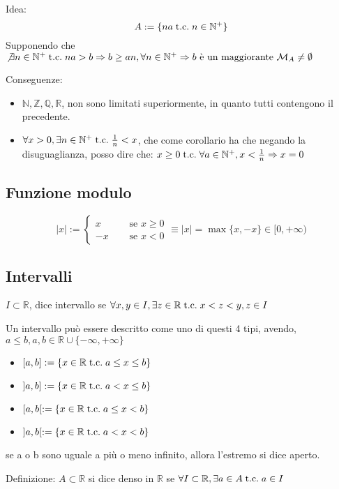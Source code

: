\documentclass[a4paper,12pt]{article}
\begin{document}
	Idea:
	\[A :=  \{na \;\text{t.c.}\; n \in \mathbb{N}^+\}\]
	Supponendo che $\not \exists n \in \mathbb{N}^+ \;\text{t.c.}\; na > b \Rightarrow b \geq an, \forall n \in \mathbb{N}^+ \Rightarrow b \text{ è un maggiorante } \mathcal{M}_A \not = \emptyset $ %
	
	Conseguenze:
	\begin{itemize}
		\item $\mathbb{N}, \mathbb{Z}, \mathbb{Q}, \mathbb{R}$, non sono limitati superiormente, in quanto tutti contengono il precedente.
		\item $\forall x > 0, \exists n \in \mathbb{N}^+ \;\text{t.c.}\; \frac{1}{n} < x$, che come corollario ha che negando la disuguaglianza, posso dire che:
		$x \geq 0 \;\text{t.c.}\; \forall a \in \mathbb{N}^+, x < \frac{1}{n} \Rightarrow x = 0$
	\end{itemize}
	
	\subsection{Funzione modulo}
	\[|x| := 
	\left\{
	\begin{aligned}
		x & \quad \text{ se } x \geq 0\\
		-x & \quad \text{ se } x < 0
	\end{aligned}
	\right. \equiv |x| = \max\{x, -x\} \in [0, +\infty)
	\]
	
	\subsection{Intervalli}
	$I \subset \mathbb{R}$, dice intervallo se $\forall x,y \in I, \exists z \in \mathbb{R} \;\text{t.c.}\; x < z < y, z \in I$
	
	Un intervallo può essere descritto come uno di questi 4 tipi, avendo, $a \leq b, a,b \in \mathbb{R} \cup \{-\infty, +\infty\}$
	\begin{itemize}
		\item $[a, b] := \{x \in \mathbb{R} \;\text{t.c.}\; a \leq x \leq b\}$
		\item $]a, b] := \{x \in \mathbb{R} \;\text{t.c.}\; a < x \leq b\}$
		\item $[a, b[ := \{x \in \mathbb{R} \;\text{t.c.}\; a \leq x < b\}$
		\item $]a, b[ := \{x \in \mathbb{R} \;\text{t.c.}\; a < x < b\}$
	\end{itemize}
	se a o b sono uguale a più o meno infinito, allora l'estremo si dice aperto.
	
	Definizione:
	$A \subset \mathbb{R}$ si dice denso in $\mathbb{R}$ se $\forall I \subset \mathbb{R}, \exists a \in A \;\text{t.c.}\; a \in I$
	
\end{document}
